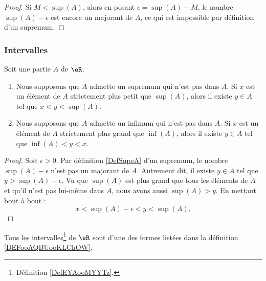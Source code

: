 \begin{proof}
	Si \( M<\sup(A)\), alors en posant \( \epsilon=\sup(A)-M\), le nombre \( \sup(A)-\epsilon\) est encore un majorant de \( A\), ce qui est impossible par définition d'un supremum.
\end{proof}

\subsubsection{Intervalles}

\begin{lemma}        \label{LEMooRMUCooMKiTGr}
	Soit une partie \( A\) de \( \eR\).
	\begin{enumerate}
		\item       \label{ITEMooIQECooFjJFKz}
		      Nous supposons que \( A\) admette un supremum qui n'est pas dans \( A\). Si \( x\) est un élément de \( A\) strictement plus petit que \( \sup(A)\), alors il existe \( y\in A\) tel que \( x<y<\sup(A)\).
		\item
		      Nous supposons que \( A\) admette un infimum qui n'est pas dans \( A\). Si \( x\) est un élément de \( A\) strictement plus grand que \( \inf(A)\), alors il existe \( y\in A\) tel que \(  \inf(A)<y<x  \).
	\end{enumerate}
\end{lemma}

\begin{proof}
	Soit \( \epsilon>0\). Par définition \ref{DefSupeA} d'un supremum, le nombre \( \sup(A)-\epsilon\) n'est pas un majorant de \( A\). Autrement dit, il existe \( y\in A\) tel que \( y>\sup(A)-\epsilon\). Vu que \( \sup(A)\) est plus grand que tous les éléments de \( A\) et qu'il n'est pas lui-même dans \( A\), nous avons aussi \( \sup(A)>y\). En mettant bout à bout :
	\begin{equation}
		x<\sup(A)-\epsilon<y<\sup(A).
	\end{equation}
\end{proof}

\begin{proposition}     \label{PROPooHPMWooQJXCAS}
	Tous les intervalles\footnote{Définition \ref{DefEYAooMYYTz}.} de \( \eR\) sont d'une des formes listées dans la définition \ref{DEFooAQBUooKLChOW}.
\end{proposition}

